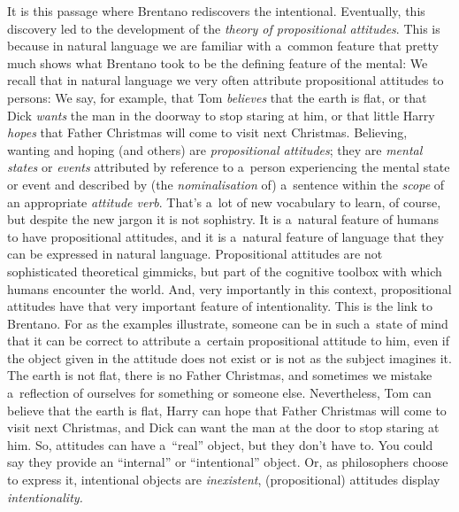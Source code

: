 It is this passage where Brentano rediscovers the intentional. Eventually, this discovery led to the development of the \textit{theory of propositional attitudes}. This is because in natural language we are familiar with a~common feature that pretty much shows what Brentano took to be the defining feature of the mental: We recall that in natural language we very often attribute propositional attitudes to persons: We say, for example, that Tom \textit{believes} that the earth is flat, or that Dick \textit{wants} the man in the doorway to stop staring at him, or that little Harry \textit{hopes} that Father Christmas will come to visit next Christmas. Believing, wanting and hoping (and others) are \textit{propositional attitudes}; they are \textit{mental states} or \textit{events} attributed by reference to a~person experiencing the mental state or event and described by (the \textit{nominalisation} of) a~sentence within the \textit{scope} of an appropriate \textit{attitude verb}. That's a~lot of new vocabulary to learn, of course, but despite the new jargon it is not sophistry. It is a~natural feature of humans to have propositional attitudes, and it is a~natural feature of language that they can be expressed in natural language. Propositional attitudes are not sophisticated theoretical gimmicks, but part of the cognitive toolbox with which humans encounter the world. And, very importantly in this context, propositional attitudes have that very important feature of intentionality. This is the link to Brentano. For as the examples illustrate, someone can be in such a~state of mind that it can be correct to attribute a~certain propositional attitude to him, even if the object given in the attitude does not exist or is not as the subject imagines it. The earth is not flat, there is no Father Christmas, and sometimes we mistake a~reflection of ourselves for something or someone else. Nevertheless, Tom can believe that the earth is flat, Harry can hope that Father Christmas will come to visit next Christmas, and Dick can want the man at the door to stop staring at him. So, attitudes can have a~``real'' object, but they don't have to. You could say they provide an ``internal'' or ``intentional'' object. Or, as philosophers choose to express it, intentional objects are \textit{inexistent}, (propositional) attitudes display \textit{intentionality.}





